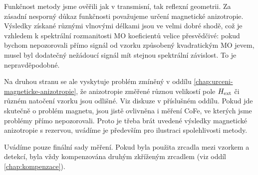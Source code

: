 Funkčnost metody jsme ověřili jak v transmisní, tak reflexní geometrii.
Za zásadní nesporný důkaz funkčnosti považujeme určení magnetické anizotropie.
Výsledky získané různými vlnovými délkami jsou ve velmi dobré shodě, což je vzhledem k spektrální rozmanitosti MO koeficientů velice přesvědčivé: pokud bychom nepozorovali přímo signál od vzorku způsobený kvadratickým MO jevem, musel byl dodatečný nežádoucí signál mít stejnou spektrální závislost.
To je nepravděpodobné.

Na druhou stranu se ale vyskytuje problém zmíněný v oddílu \ref{chap:urceni-magneticke-anizotropie}, že anizotropie změřené různou velikostí pole $H_\textrm{ext}$ či různém natočení vzorku jsou odlišné.
Viz diskuze v příslušném oddílu.
Pokud jde skutečně o problém magnetu, jsou jistě ovlivněna i měření CoFe, ve kterých jsme problémy přímo nepozorovali.
Proto je třeba brát uvedené výsledky magnetické anizotropie s rezervou, uvádíme je především pro ilustraci spolehlivosti metody.

Uvádíme pouze finální sady měření.
Pokud byla použita zrcadla mezi vzorkem a detekcí, byla vždy kompenzována druhým zkříženým zrcadlem (viz oddíl \ref{chap:kompenzace}).

